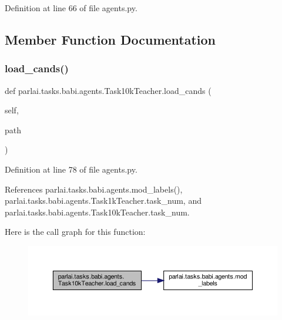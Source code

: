 Definition at line 66 of file agents.\+py.



\subsection{Member Function Documentation}
\mbox{\label{classparlai_1_1tasks_1_1babi_1_1agents_1_1Task10kTeacher_af80438ce3c1fa375e4dbed775afb9ed2}} 
\subsubsection{\texorpdfstring{load\+\_\+cands()}{load\_cands()}}
{\footnotesize\ttfamily def parlai.\+tasks.\+babi.\+agents.\+Task10k\+Teacher.\+load\+\_\+cands (\begin{DoxyParamCaption}\item[{}]{self,  }\item[{}]{path }\end{DoxyParamCaption})}



Definition at line 78 of file agents.\+py.



References parlai.\+tasks.\+babi.\+agents.\+mod\+\_\+labels(), parlai.\+tasks.\+babi.\+agents.\+Task1k\+Teacher.\+task\+\_\+num, and parlai.\+tasks.\+babi.\+agents.\+Task10k\+Teacher.\+task\+\_\+num.

Here is the call graph for this function\+:
\nopagebreak
\begin{figure}[H]
\begin{center}
\leavevmode
\includegraphics[width=350pt]{classparlai_1_1tasks_1_1babi_1_1agents_1_1Task10kTeacher_af80438ce3c1fa375e4dbed775afb9ed2_cgraph}
\end{center}
\end{figure}
\mbox{\label{classparlai_1_1tasks_1_1babi_1_1agents_1_1Task10kTeacher_a658de67a884d117c04f54e3f9d4bec4a}} 
